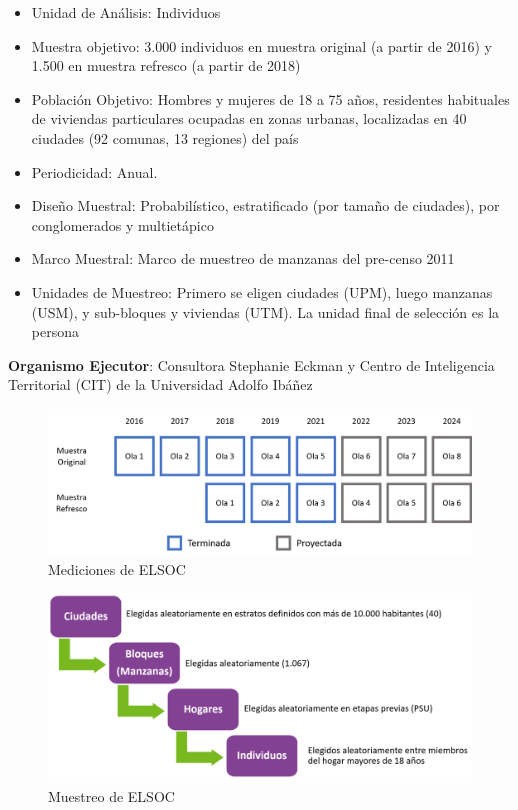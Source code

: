 \documentclass[
  12pt,
]{book}
\begin{document}
\begin{itemize}
\item
  Unidad de Análisis: Individuos
\item
  Muestra objetivo: 3.000 individuos en muestra original (a partir de 2016) y 1.500 en muestra refresco (a partir de 2018)
\item
  Población Objetivo: Hombres y mujeres de 18 a 75 años, residentes habituales de viviendas particulares ocupadas en zonas urbanas, localizadas en 40 ciudades (92 comunas, 13 regiones) del país
\item
  Periodicidad: Anual.
\item
  Diseño Muestral: Probabilístico, estratificado (por tamaño de ciudades), por conglomerados y multietápico
\item
  Marco Muestral: Marco de muestreo de manzanas del pre-censo 2011
\item
  Unidades de Muestreo: Primero se eligen ciudades (UPM), luego manzanas (USM), y sub-bloques y viviendas (UTM). La unidad final de selección es la persona
\end{itemize}

\textbf{Organismo Ejecutor}: Consultora Stephanie Eckman y Centro de Inteligencia Territorial (CIT) de la Universidad Adolfo Ibáñez

\begin{figure}

{\centering \includegraphics[width=22.1in]{inputs/imagenes/olas_elsoc} 

}

\caption{Mediciones de ELSOC}\label{fig:ilust-olas-elsoc}
\end{figure}

\begin{figure}

{\centering \includegraphics[width=25.24in]{inputs/imagenes/etapas_seleccion} 

}

\caption{Muestreo de ELSOC}\label{fig:ilust-etapas-seleccion}
\end{figure}
\end{document}
